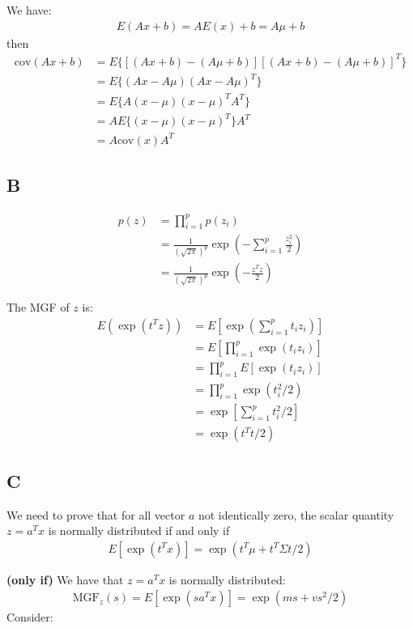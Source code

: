 \documentclass{article}
\begin{document}
We have:
\begin{align*}
E(Ax + b) = A E(x) + b = A\mu + b
\end{align*}
then 
\begin{align*}
\mbox{cov}(Ax + b) &= E\{[(Ax+b) - (A\mu + b)][(Ax+b) - (A\mu + b)]^T\}\\
&= E\{ (Ax - A\mu)(Ax - A\mu)^T \}\\
&= E\{ A(x - \mu)(x - \mu)^TA^T \}\\
&= A E\{(x - \mu)(x - \mu)^T \} A^T\\
&= A \mbox{cov}(x)A^T
\end{align*}


\subsection*{B}

\begin{align*}
p(z) &= \prod_{i=1}^p p(z_i)\\
&= \frac{1}{(\sqrt{2\pi})^p}\exp\left(-\sum_{i=1}^p\frac{z_i^2}{2}\right)\\
&= \frac{1}{(\sqrt{2\pi})^p}\exp\left(-\frac{z^Tz}{2}\right)
\end{align*}

The MGF of \(z\) is:
\begin{align*}
E(\exp(t^Tz)) &= E\left[\exp\left(\sum_{i=1}^p t_iz_i\right)\right]\\
&= E\left[ \prod_{i=1}^p \exp(t_iz_i) \right]\\
&= \prod_{i=1}^p E[\exp(t_iz_i)]\\
&=\prod_{i=1}^p \exp(t_i^2/2)\\
&= \exp \left[ \sum_{i=1}^p t_i^2/2 \right]\\
&= \exp(t^Tt/2)
\end{align*}

\subsection*{C}
We need to prove that for all vector \(a\) not identically zero, the scalar quantity \(z = a^T x\) is normally distributed if and only if
\begin{align*}
E[\exp(t^Tx)] = \exp(t^T\mu + t^T\Sigma t/2)
\end{align*}

\noindent
{\bf (only if)} We have that \(z = a^T x\) is normally distributed:
\begin{align*}
\mathrm{MGF}_z(s) = E[\exp(sa^Tx)] = \exp(ms + vs^2/2)
\end{align*}
Consider:
\end{document}
